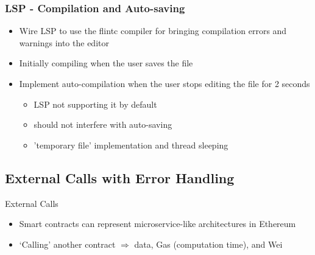 \documentclass[aspectratio=169]{beamer}
\begin{document}
\begin{frame}
\frametitle{LSP - Compilation and Auto-saving}
\begin{itemize}
    \item Wire LSP to use the flintc compiler for bringing compilation errors and warnings into the editor
    \item Initially compiling when the user saves the file
    \item Implement auto-compilation when the user stops editing the file for 2 seconds
    \begin{itemize}
        \item LSP not supporting it by default
        \item should not interfere with auto-saving
        \item 'temporary file' implementation and thread sleeping
    \end{itemize}
\end{itemize}
\end{frame}

\subsection{External Calls with Error Handling}

\begin{frame}{External Calls}
    \begin{itemize}
        \item Smart contracts can represent microservice-like architectures in Ethereum
        \item `Calling' another contract $\Rightarrow$ data, Gas (computation time), and Wei
    \end{itemize}
\end{frame}
\end{document}
